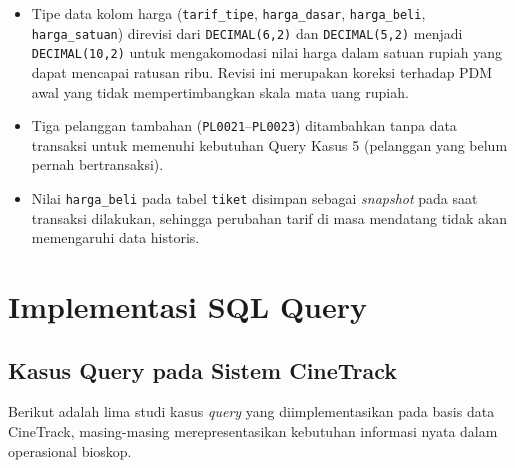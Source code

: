 \documentclass[letter,12pt,bahasa]{article}
\begin{document}
\begin{itemize}
    \item Tipe data kolom harga (\texttt{tarif\_tipe}, \texttt{harga\_dasar}, \texttt{harga\_beli}, \texttt{harga\_satuan}) direvisi dari \texttt{DECIMAL(6,2)} dan \texttt{DECIMAL(5,2)} menjadi \texttt{DECIMAL(10,2)} untuk mengakomodasi nilai harga dalam satuan rupiah yang dapat mencapai ratusan ribu. Revisi ini merupakan koreksi terhadap PDM awal yang tidak mempertimbangkan skala mata uang rupiah.
    \item Tiga pelanggan tambahan (\texttt{PL0021}--\texttt{PL0023}) ditambahkan tanpa data transaksi untuk memenuhi kebutuhan Query Kasus 5 (pelanggan yang belum pernah bertransaksi).
    \item Nilai \texttt{harga\_beli} pada tabel \texttt{tiket} disimpan sebagai \textit{snapshot} pada saat transaksi dilakukan, sehingga perubahan tarif di masa mendatang tidak akan memengaruhi data historis.
\end{itemize}

\clearpage

\section{Implementasi SQL Query}

\subsection{Kasus Query pada Sistem CineTrack}

Berikut adalah lima studi kasus \textit{query} yang diimplementasikan pada basis data CineTrack, masing-masing merepresentasikan kebutuhan informasi nyata dalam operasional bioskop.
\end{document}
